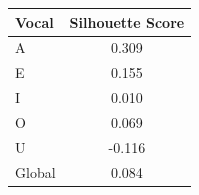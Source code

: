\begin{tabular}{lc}
\toprule
\rowcolor{col01}
Vocal & Silhouette Score \\
\midrule
A & 0.309 \\
E & 0.155 \\
I & 0.010 \\
O & 0.069 \\
U & -0.116 \\
Global & 0.084 \\
\bottomrule
\end{tabular}
